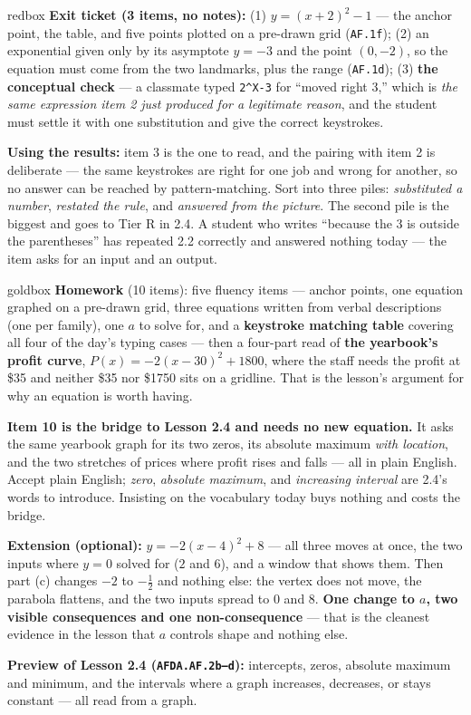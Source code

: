 \documentclass[10pt]{article}
\begin{document}
\boxguard[16]
\begin{skillbox}{redbox}
\textbf{Exit ticket (3 items, no notes):} (1) $y=(x+2)^2-1$ --- the anchor point, the table, and five
points plotted on a pre-drawn grid (\texttt{AF.1f}); (2) an exponential given only by its asymptote
$y=-3$ and the point $(0,-2)$, so the equation must come from the two landmarks, plus the range
(\texttt{AF.1d}); (3) \textbf{the conceptual check} --- a classmate typed \texttt{2\^{}X-3} for ``moved
right $3$,'' which is \emph{the same expression item 2 just produced for a legitimate reason}, and the
student must settle it with one substitution and give the correct keystrokes.

\textbf{Using the results:} item 3 is the one to read, and the pairing with item 2 is deliberate ---
the same keystrokes are right for one job and wrong for another, so no answer can be reached by
pattern-matching. Sort into three piles: \emph{substituted a number}, \emph{restated the rule}, and
\emph{answered from the picture}. The second pile is the biggest and goes to Tier R in 2.4. A student
who writes ``because the $3$ is outside the parentheses'' has repeated 2.2 correctly and answered
nothing today --- the item asks for an input and an output.
\end{skillbox}

\boxguard[18]
\begin{skillbox}{goldbox}
\textbf{Homework} (10 items): five fluency items --- anchor points, one equation graphed on a
pre-drawn grid, three equations written from verbal descriptions (one per family), one $a$ to solve
for, and a \textbf{keystroke matching table} covering all four of the day's typing cases --- then a
four-part read of \textbf{the yearbook's profit curve}, $P(x)=-2(x-30)^2+1800$, where the staff needs
the profit at \$35 and neither \$35 nor \$1750 sits on a gridline. That is the lesson's argument for
why an equation is worth having.

\textbf{Item 10 is the bridge to Lesson 2.4 and needs no new equation.} It asks the same yearbook
graph for its two zeros, its absolute maximum \emph{with location}, and the two stretches of prices
where profit rises and falls --- all in plain English. Accept plain English; \emph{zero},
\emph{absolute maximum}, and \emph{increasing interval} are 2.4's words to introduce. Insisting on the
vocabulary today buys nothing and costs the bridge.

\textbf{Extension (optional):} $y=-2(x-4)^2+8$ --- all three moves at once, the two inputs where
$y=0$ solved for ($2$ and $6$), and a window that shows them. Then part (c) changes $-2$ to
$-\tfrac12$ and nothing else: the vertex does not move, the parabola flattens, and the two inputs
spread to $0$ and $8$. \textbf{One change to $a$, two visible consequences and one non-consequence}
--- that is the cleanest evidence in the lesson that $a$ controls shape and nothing else.

\textbf{Preview of Lesson 2.4 (\texttt{AFDA.AF.2b--d}):} intercepts, zeros, absolute maximum and
minimum, and the intervals where a graph increases, decreases, or stays constant --- all read from a
graph.
\end{skillbox}
\end{document}
